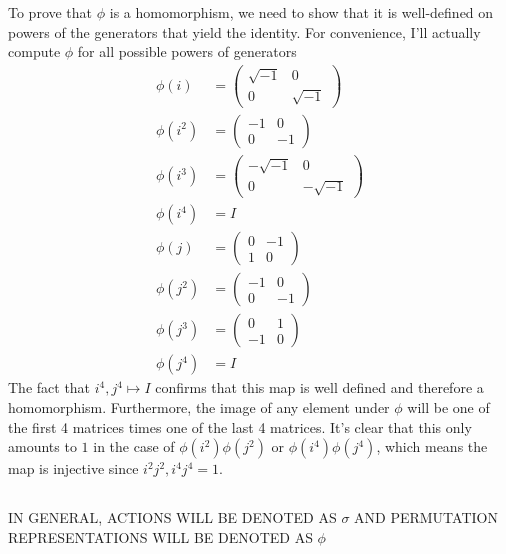 \documentclass{article}
\begin{document}
\subsubsection{}\label{ex6p26}
To prove that $\phi$ is a homomorphism, we need to show that it is well-defined on powers of the generators that yield the identity. For convenience, I'll actually compute $\phi$ for all possible powers of generators
\begin{align*}
\phi(i) &= 
\begin{pmatrix}
\sqrt{-1} 	& 0\\
0			& \sqrt{-1}
\end{pmatrix}\\
\phi(i^2) &= 
\begin{pmatrix}
-1 	& 0\\
0	& -1
\end{pmatrix}\\
\phi(i^3) &= 
\begin{pmatrix}
-\sqrt{-1} 	& 0\\
0	& -\sqrt{-1}
\end{pmatrix}\\
\phi(i^4) &= I\\
\phi(j) &= 
\begin{pmatrix}
0 	&	-1\\
1	&	0
\end{pmatrix}\\
\phi(j^2) &= 
\begin{pmatrix}
-1 	&	0\\
0	&	-1
\end{pmatrix}\\
\phi(j^3) &= 
\begin{pmatrix}
0	&	1\\
-1	&	0
\end{pmatrix}\\
\phi(j^4) &= I
\end{align*}
The fact that $i^4,j^4 \mapsto I$ confirms that this map is well defined and therefore a homomorphism. Furthermore, the image of any element under $\phi$ will be one of the first 4 matrices times one of the last 4 matrices. It's clear that this only amounts to $1$ in the case of $\phi(i^2)\phi(j^2)$ or $\phi(i^4)\phi(j^4)$, which means the map is injective since $i^2j^2,i^4j^4=1$.
\subsection{}
IN GENERAL, ACTIONS WILL BE DENOTED AS $\sigma$ AND PERMUTATION REPRESENTATIONS WILL BE DENOTED AS $\phi$
\end{document}
